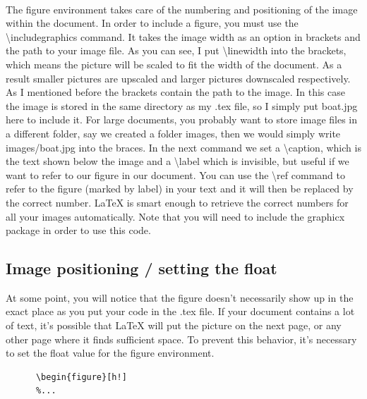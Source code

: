     \paragraph{ }
      The figure environment takes care of the numbering and positioning of the image within the document. In order to include a figure, you must use the \textbackslash includegraphics command. It takes the image width as an option in brackets and the path to your image file. As you can see, I put \textbackslash linewidth into the brackets, which means the picture will be scaled to fit the width of the document. As a result smaller pictures are upscaled and larger pictures downscaled respectively. As I mentioned before the brackets contain the path to the image. In this case the image is stored in the same directory as my .tex file, so I simply put boat.jpg here to include it. For large documents, you probably want to store image files in a different folder, say we created a folder images, then we would simply write images/boat.jpg into the braces. In the next command we set a \textbackslash caption, which is the text shown below the image and a \textbackslash label which is invisible, but useful if we want to refer to our figure in our document. You can use the \textbackslash ref command to refer to the figure (marked by label) in your text and it will then be replaced by the correct number. LaTeX is smart enough to retrieve the correct numbers for all your images automatically. Note that you will need to include the graphicx package in order to use this code.




  \subsection{Image positioning / setting the float}

    At some point, you will notice that the figure doesn't 
    necessarily show up in the exact place as you put your 
    code in the .tex file. If your document contains a lot 
    of text, it's possible that LaTeX will put the picture 
    on the next page, or any other page where it finds sufficient 
    space. To prevent this behavior, it's necessary to set 
    the float value for the figure environment.



    \begin{lstlisting}[language={[LaTeX]TeX}, breaklines=true,frame=single]
      %...
      \begin{figure}[h!]
      %...
      \end{lstlisting}

